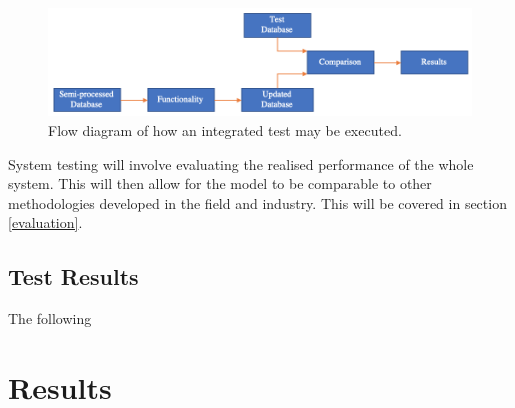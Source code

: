 \documentclass[10pt,onecolumn,letterpaper]{article}
\begin{document}
\begin{figure}[!hbt!]
\centering
\includegraphics[width=16.5cm]{integrated_testing.png}
\caption{Flow diagram of how an integrated test may be executed.}
\end{figure}

System testing will involve evaluating the realised performance of the whole system. This will then allow for the model to be comparable to other methodologies developed in the field and industry. This will be covered in section \ref{evaluation}.

\subsection{Test Results} 

The following


\newpage

\section{Results} \label{results}

\end{document}
